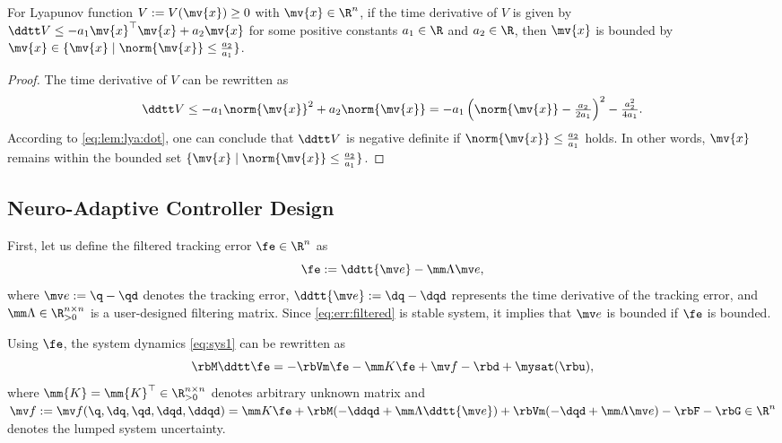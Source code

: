 \documentclass[lettersize,journal]{IEEEtran}
\begin{document}
\begin{lem} \label{lem:stable:set}
    For Lyapunov function $V:=V(\mv{x})\ge0$ with $\mv{x}\in\R^n$, if the time derivative of $V$ is given by $\ddtt V\le -a_1 \mv{x}^\top \mv{x} + a_2 \mv{x}$ for some positive constants $a_1\in\R$ and $a_2\in\R$, then $\mv{x}$ is bounded by $\mv{x}\in\{\mv{x}\mid\norm{\mv{x}}\le\tfrac{a_2}{a_1}\}$.
\end{lem}

\begin{proof}
    The time derivative of $V$ can be rewritten as
    \begin{equation}
        \ddtt V
        \le
        -a_1 \norm{\mv{x}}^2 + a_2 \norm{\mv{x}}
        =
        -a_1
        \left(
            \norm{\mv{x}}-\tfrac{a_2}{2a_1}
        \right)^2
        -
        \tfrac{a_2^2}{4a_1}
        .
        \label{eq:lem:lya:dot}
    \end{equation}
    According to \eqref{eq:lem:lya:dot}, one can conclude that $\ddtt V$ is negative definite if $\norm{\mv{x}}\le\tfrac{a_2}{a_1}$ holds.
    In other words, $\mv{x}$ remains within the bounded set $\{\mv{x}\mid\norm{\mv{x}}\le\tfrac{a_2}{a_1}\}$.
\end{proof}


\subsection{Neuro-Adaptive Controller Design}\label{sec:sub:NAC}

First, let us define the filtered tracking error $\fe\in\R^n$ as 
\begin{equation}
    \fe := \ddtt{\mv e}-\mm\Lambda \mv e
    ,
    \label{eq:err:filtered}
\end{equation}
where $\mv e := \q - \qd$ denotes the tracking error, $\ddtt{\mv e} := \dq - \dqd$ represents the time derivative of the tracking error, and $\mm\Lambda\in\R^{n\times n}_{>0}$ is a user-designed filtering matrix.
Since \eqref{eq:err:filtered} is stable system, it implies that $\mv e$ is bounded if $\fe$ is bounded.

Using $\fe$, the system dynamics \eqref{eq:sys1} can be rewritten as
\begin{equation}
    \rbM \ddtt\fe
    =
    -\rbVm \fe
    -\mm K \fe
    + \mv f
    -\rbd + \mysat(\rbu)
    ,
    \label{eq:sys:filtered}
\end{equation}
where $\mm{K}=\mm{K}^\top\in\R^{n\times n}_{>0}$ denotes arbitrary unknown matrix and $
    \mv f:= \mv f(\q,\dq,\qd,\dqd,\ddqd)
    =
    \mm K \fe
    +\rbM(-\ddqd+\mm\Lambda\ddtt{\mv e})
    +
    \rbVm(-\dqd+\mm\Lambda\mv e)
    -
    \rbF
    -
    \rbG
    \in\R^n
$ denotes the lumped system uncertainty.
\end{document}
